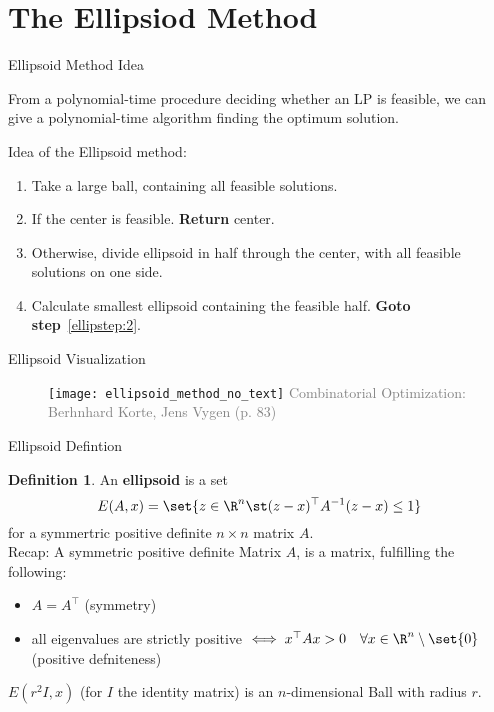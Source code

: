\documentclass[a4paper, x11names, svgnames]{beamer}
\theoremstyle{definition}
\newtheorem*{defn}{Definition}
\theoremstyle{plain}
\theoremstyle{plain}
\begin{document}
\linespread{1.1}

\section[Ellipsoid]{The Ellipsiod Method}

\begin{frame}{Ellipsoid Method Idea}
    \begin{theorem}[Kachiyani]
        From a polynomial-time procedure deciding whether an LP is feasible,
        we can give a polynomial-time algorithm finding the optimum solution.
    \end{theorem}
    \pause
    \vspace{0.5cm}
    Idea of the Ellipsoid method:
    \begin{enumerate}
        \item Take a large ball, containing all feasible solutions.
        \item \label{ellipstep:2} If the center is feasible. \textbf{Return} center.
        \item Otherwise, divide ellipsoid in half through the center, with all feasible solutions on one side.
        \item Calculate smallest ellipsoid containing the feasible half. \textbf{Goto step}~\ref{ellipstep:2}.
    \end{enumerate}
\end{frame}

\begin{frame}{Ellipsoid Visualization}
    \begin{figure}
        \center
        \texttt{[image: ellipsoid\_method\_no\_text]} %
        \vfill
        \tiny\textcolor{gray}{Combinatorial Optimization: Berhnhard Korte, Jens Vygen (p. 83)}
    \end{figure}
\end{frame}

\begin{frame}{Ellipsoid Defintion}
    \begin{defn}
        An \textbf{ellipsoid} is a set
        \[E(A,x) = \set{z\in\R^n\st (z-x)^\top A^{-1}(z-x) \leq 1}\]
        for a symmertric positive definite $n \times n$ matrix $A$. \\
        \pause
        \vspace{0.3cm}  %
        Recap: A symmetric positive definite Matrix $A$, is a matrix, fulfilling the following:
        \begin{itemize}
            \item $A = A^\top$ (symmetry)
            \item all eigenvalues are strictly positive $\iff x^\top A x > 0 \quad \forall x\in\R^n \setminus\set{0}$ (positive defniteness)
        \end{itemize}
    \end{defn}
    \pause
    \begin{example}
        $E(r^2 I, x)$ (for $I$ the identity matrix) is an $n$-dimensional Ball with radius $r$.
    \end{example}
\end{frame}
\end{document}
